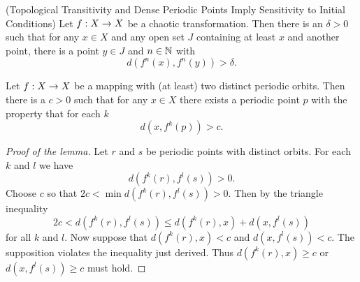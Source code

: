 \documentclass[12pt,draft,twoside]{book}
\begin{document}
\begin{proposition}
  (Topological Transitivity and Dense Periodic Points Imply Sensitivity to Initial Conditions)
  Let $f: X\rightarrow X$ be a chaotic transformation. Then there is an $\delta > 0$ such that
  for any $x\in X$ and any open set $J$ containing at least $x$ and another point, there is
  a point $y\in J$ and $n\in \mathbb{N}$ with
  \begin{equation*}
    d(f^n(x),f^n(y)) > \delta.
  \end{equation*}
  \label{thm:sensitivity}
\end{proposition}
\begin{lemma}
  Let $f: X\rightarrow X$ be a mapping with (at least) two distinct periodic orbits.
  Then there is a $c > 0$ such that for any $x\in X$ there exists a periodic
  point $p$ with the property that for each $k$
  \begin{equation*}
    d(x, f^k(p)) > c.
  \end{equation*}
\end{lemma}
\begin{proof}[Proof of the lemma]
  Let $r$ and $s$ be periodic points with distinct orbits. For each $k$ and $l$ we have
  \begin{equation*}
    d(f^k(r), f^l(s)) > 0.
  \end{equation*}
  Choose $c$ so that $2c < \min d(f^k(r),f^l(s)) > 0$. Then by the triangle inequality
  \begin{equation*}
    2c < d(f^k(r),f^l(s)) \leq d(f^k(r),x) + d(x,f^l(s))
  \end{equation*}
  for all $k$ and $l$. Now suppose that $d(f^k(r),x)<c$ and $d(x,f^l(s))<c$. The supposition
  violates the inequality just derived. Thus $d(f^k(r),x) \geq c$ or $d(x,f^l(s)) \geq c$ must hold.
\end{proof}
\end{document}
